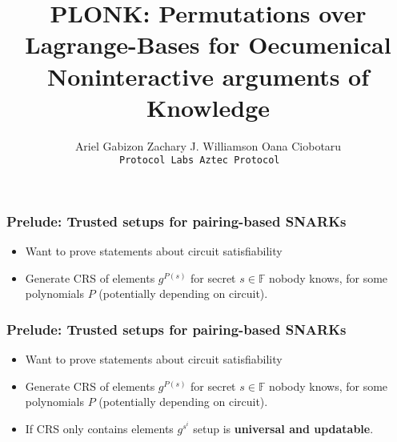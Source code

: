\documentclass[shadesubsections,trans,14pt,mathserif]{beamer}
\title{\large{PLONK: Permutations over Lagrange-Bases for Oecumenical Noninteractive arguments of Knowledge}}    %
\author{\small{Ariel Gabizon  \; Zachary J. Williamson   \;Oana Ciobotaru}\\                 %
\tt{\footnotesize{Protocol Labs   \;\;\;\;\;\; Aztec Protocol   \;\;\;\;\;\;\;\;\;\;\;\;     \;\;\;\;\;\;\;\;\;\;\;\;\;\;\;\;\;\;\;     \;\;            \;\;\;\;\;\;\;\;\;\;\;\;          \;\;\;\;\;\;\;\;\;\;\;\;\;\;\;\;\;\;\;\;\;\;\;\;\;\;\;\;\;\;}                                       } }      %
\date{}                    %
\newcommand{\F}{\ensuremath{\mathbb F}}
\begin{document}
\boldmath
\begin{frame}
  \titlepage
\end{frame}


\begin{frame}
\frametitle{Prelude: Trusted setups for pairing-based SNARKs}   %
 
  \begin{itemize}
  \item Want to prove statements about circuit satisfiability
\item Generate CRS of elements $g^{P(s)}$ for secret $s\in \F$ nobody knows, for some polynomials $P$ (potentially depending on circuit).
  \end{itemize}


\end{frame}

\begin{frame}
\frametitle{Prelude: Trusted setups for pairing-based SNARKs}   %
 
  \begin{itemize}
  \item Want to prove statements about circuit satisfiability
\item Generate CRS of elements $g^{P(s)}$ for secret $s\in \F$ nobody knows, for some polynomials $P$ (potentially depending on circuit).
\item If CRS only contains elements $g^{s^i}$ setup is \textbf{universal and updatable}.

\end{itemize}


\end{frame}
\end{document}
